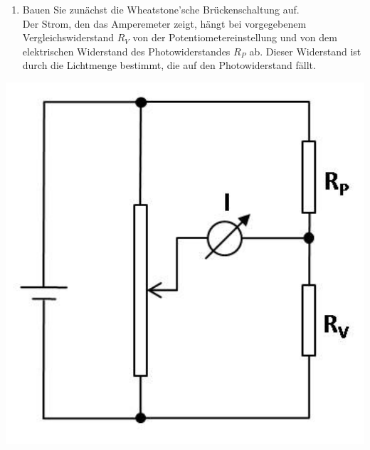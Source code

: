 \begin{minipage}{0.6\textwidth}
 \begin{enumerate}
  \item Bauen Sie zunächst die Wheatstone'sche Brückenschaltung auf.\\
  
   Der Strom, den das Amperemeter zeigt, hängt bei vorgegebenem Vergleichswiderstand $R_V$ von der Potentiometereinstellung und von dem elektrischen Widerstand des Photowiderstandes $R_P$ ab. Dieser
   Widerstand ist durch die Lichtmenge bestimmt, die auf den Photowiderstand fällt.
 \end{enumerate}
\end{minipage}
%
\begin{minipage}{0.35\textwidth}
 \includegraphics[width=1.00\textwidth]{Versuch_13-14/Abbildungen/Wheatstone14.jpg}
 \label{fig:Schaltung1}
\end{minipage}

